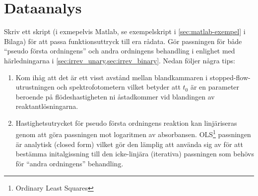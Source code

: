 \section{Dataanalys}
\label{sec:analys}
Skriv ett skript (i exmepelvis Matlab, se exempelskript i
\cref{sec:matlab-exempel} i Bilaga) för att passa funktionsuttryck 
till era rådata. Gör passningen för både ``pseudo första ordningens''
och andra ordningens behandling i enlighet med härledningarna i
\cref{sec:irrev_unary,sec:irrev_binary}. Nedan följer några tips:

\begin{enumerate}
\item Kom ihåg att det är ett visst
avstånd mellan blandkammaren i stopped-flow-utrustningen och
spektrofotometern vilket betyder att $t_0$ är en parameter beroende på
flödeshastigheten ni åstadkommer vid blandingen av reaktantlösningarna.
\item Hastighetsutrycket för pseudo första ordningens reaktion kan
  linjäriseras genom att göra passningen mot logaritmen av
  absorbansen. OLS\footnote{Ordinary Least Squares} passningen är
  analytisk (closed form) vilket gör den lämplig att använda sig av för
  att bestämma initalgissning till den icke-linjära (iterativa)
  passningen som behövs för ``andra ordningens'' behandling.
\end{enumerate}

